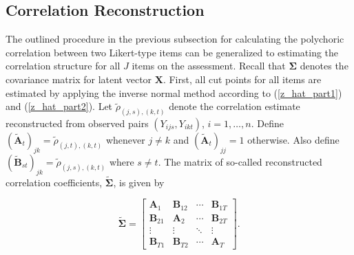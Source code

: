 \documentclass[12pt]{article}
\begin{document}
\subsection{Correlation Reconstruction}

The outlined procedure in the previous subsection for calculating the polychoric correlation between two Likert-type items can
be generalized to estimating the correlation structure for all $J$ items on
the assessment. Recall that $\boldsymbol{\Sigma}$ denotes the covariance
matrix for latent vector $\mathbf{X}$. First, all cut points for all items are estimated by applying the inverse normal method according to (\ref{z_hat_part1}) and (\ref{z_hat_part2}). %
Let $\tilde{\rho}_{(j,s),(k,t)}$ denote the correlation estimate
reconstructed from observed pairs $(Y_{ijs}, Y_{ikt})$, $%
i=1,\ldots,n$. Define $(\tilde{\mathbf{A}}_t)_{jk}=\tilde{\rho}_{(j,t),(k,t)}
$ whenever $j\not=k$ and $(\tilde{\mathbf{A}}_t)_{jj}=1$ otherwise. Also define 
$(\tilde{\mathbf{B}}_{st})_{jk}=\tilde{\rho}_{(j,s),(k,t)}$ where $s\not=t$.
The matrix of so-called reconstructed correlation coefficients, $\boldsymbol{\tilde{\Sigma}}$, is given by

\begin{center}
\begin{equation}  \label{sigmamat_tilde}
\boldsymbol{\tilde{\Sigma}} = \left[ 
\begin{array}{cccc}
\mathbf{A}_1 & \mathbf{B}_{12} & \cdots & \mathbf{B}_{1T} \\ 
\mathbf{B}_{21} & \mathbf{A}_{2} & \cdots & \mathbf{B}_{2T} \\ 
\vdots & \vdots & \ddots & \vdots \\ 
\mathbf{B}_{T1} & \mathbf{B}_{T2} & \cdots & \mathbf{A}_{T}%
\end{array}
\right].
\end{equation}
\end{center}
\end{document}
